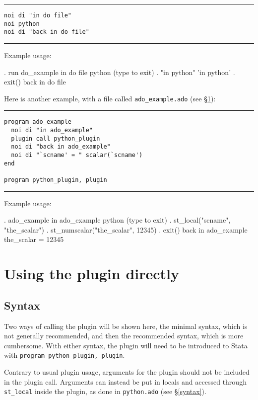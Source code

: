 \documentclass{article}
\begin{document}
\hrule
\begin{lstlisting}
noi di "in do file"
noi python
noi di "back in do file"
\end{lstlisting}
\hrule

\vspace{5mm}
\noindent Example usage:
\begin{stlog}
{\smallskip}
. run do_example
in do file
 python (type {} to exit) 
. "in python"
'in python'
{\smallskip}
. exit()
back in do file
\end{stlog}

\vspace{5mm}
\noindent Here is another example, with a file called \lstinline{ado_example.ado} (see \S\ref{using_plugin}): \newline

\hrule
\begin{lstlisting}
program ado_example
  noi di "in ado_example"
  plugin call python_plugin
  noi di "back in ado_example"
  noi di "`scname' = " scalar(`scname')
end

program python_plugin, plugin
\end{lstlisting}
\hrule

\vspace{5mm}
\noindent Example usage:
\begin{stlog}
{\smallskip}
. ado_example
in ado_example
 python (type {} to exit) 
. st_local("scname", "the_scalar")
{\smallskip}
. st_numscalar("the_scalar", 12345)
{\smallskip}
. exit()
back in ado_example
the_scalar = 12345
\end{stlog}


\section{Using the plugin directly} \label{using_plugin}

	\subsection{Syntax}
	
	Two ways of calling the plugin will be shown here, the minimal syntax, which is not generally recommended, and then the recommended syntax, which is more cumbersome. With either syntax, the plugin will need to be introduced to Stata with \lstinline{program python_plugin, plugin}. 
	
	Contrary to usual plugin usage, arguments for the plugin should not be included in the plugin call. Arguments can instead be put in locals and accessed through \lstinline{st_local} inside the plugin, as done in \lstinline{python.ado} (see \S\ref{syntax}).
\end{document}
